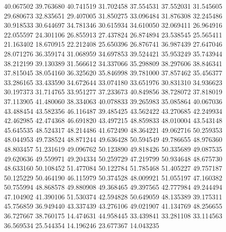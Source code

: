 40.067502
39.763680
40.741519
31.702458
37.554531
37.552031
31.545605
29.680673
32.835651
29.407005
31.850275
33.096484
31.876308
32.245486
30.918533
30.644697
34.781346
30.615934
34.610050
32.069411
26.964916
22.055597
24.301106
26.855913
27.437824
26.874894
23.538545
25.565411
21.163402
18.670915
22.212408
25.650396
26.876741
36.987439
27.647046
28.071276
36.359174
31.068959
34.697853
39.524421
35.953249
35.743944
38.212199
39.130389
31.566612
34.337066
35.298809
38.297606
38.846341
37.815045
38.054160
36.325620
35.846998
39.781000
37.857462
35.456377
33.286165
33.433590
34.672644
33.074180
33.651976
30.831310
34.936623
30.197373
31.714765
33.951277
37.233673
40.849856
38.728072
37.818019
37.113905
41.480060
38.334063
40.078833
39.265983
35.085864
40.067036
43.488454
43.582356
46.116487
39.485425
43.562422
43.270685
42.249934
42.462985
42.474368
46.691820
43.497215
48.859833
48.010004
43.543148
45.645535
48.524317
48.214486
41.672490
48.364221
49.062716
50.259353
48.044953
49.738524
48.871244
49.636428
50.594549
49.786655
48.976360
48.803457
51.231619
49.096762
50.123890
49.818426
50.335689
49.087535
49.620636
49.559971
49.204334
50.259729
47.219799
50.934648
48.675730
48.633160
50.108452
51.477084
50.122784
51.785468
51.405227
49.757187
50.125229
50.464190
46.115979
50.374528
48.009921
51.055197
47.160382
50.755994
48.868578
49.880908
49.368465
49.397565
42.777984
49.244494
47.104902
41.390106
51.530374
42.594828
50.649059
48.135389
39.175311
45.756859
36.949440
43.337439
43.276106
49.021907
41.134769
48.256655
36.727667
38.760175
14.474631
44.958445
33.439841
33.281108
33.114563
36.569534
25.544354
14.196246
23.677367
14.043235
